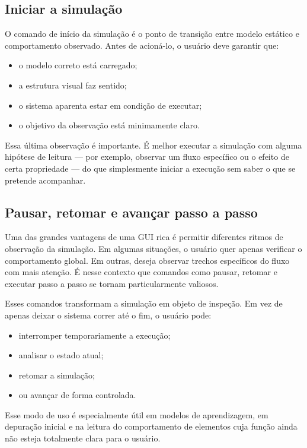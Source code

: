 \subsection{Iniciar a simulação}
\label{subsec:cap5_iniciar_simulacao}

O comando de início da simulação é o ponto de transição entre modelo estático e comportamento observado. Antes de acioná-lo, o usuário deve garantir que:
\begin{itemize}
    \item o modelo correto está carregado;
    \item a estrutura visual faz sentido;
    \item o sistema aparenta estar em condição de executar;
    \item o objetivo da observação está minimamente claro.
\end{itemize}

Essa última observação é importante. É melhor executar a simulação com alguma hipótese de leitura — por exemplo, observar um fluxo específico ou o efeito de certa propriedade — do que simplesmente iniciar a execução sem saber o que se pretende acompanhar.

\subsection{Pausar, retomar e avançar passo a passo}
\label{subsec:cap5_pausar_retormar_passo_a_passo}

Uma das grandes vantagens de uma GUI rica é permitir diferentes ritmos de observação da simulação. Em algumas situações, o usuário quer apenas verificar o comportamento global. Em outras, deseja observar trechos específicos do fluxo com mais atenção. É nesse contexto que comandos como pausar, retomar e executar passo a passo se tornam particularmente valiosos.

Esses comandos transformam a simulação em objeto de inspeção. Em vez de apenas deixar o sistema correr até o fim, o usuário pode:
\begin{itemize}
    \item interromper temporariamente a execução;
    \item analisar o estado atual;
    \item retomar a simulação;
    \item ou avançar de forma controlada.
\end{itemize}

Esse modo de uso é especialmente útil em modelos de aprendizagem, em depuração inicial e na leitura do comportamento de elementos cuja função ainda não esteja totalmente clara para o usuário.

